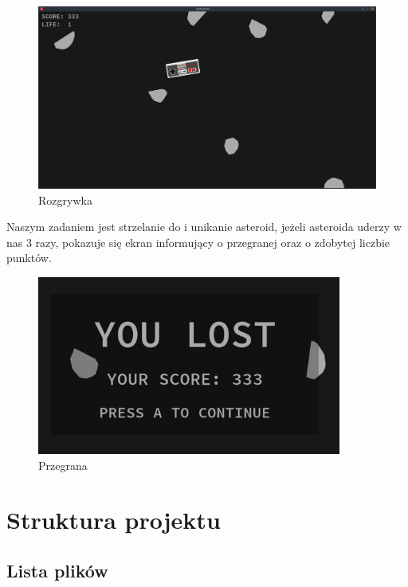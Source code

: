 \documentclass[12pt,a4paper]{article}
\begin{document}
  \begin{figure}[h!]
  \begin{center}
    \includegraphics[width=\textwidth]{images/przyklad-gry.png}
  \end{center}
  \caption{Rozgrywka}
  \label{fig:nes}
  \end{figure}

\noindent Naszym zadaniem jest strzelanie do i unikanie asteroid, jeżeli asteroida uderzy w nas 3 razy, pokazuje się ekran informujący o przegranej oraz o zdobytej liczbie punktów.

  \begin{figure}[H]
  \begin{center}
    \includegraphics[width=10cm]{images/przegrana2.png}
  \end{center}
  \caption{Przegrana}
  \label{fig:nes}
  \end{figure}

  \newpage

\section{Struktura projektu}
\subsection{Lista plików}
\end{document}
